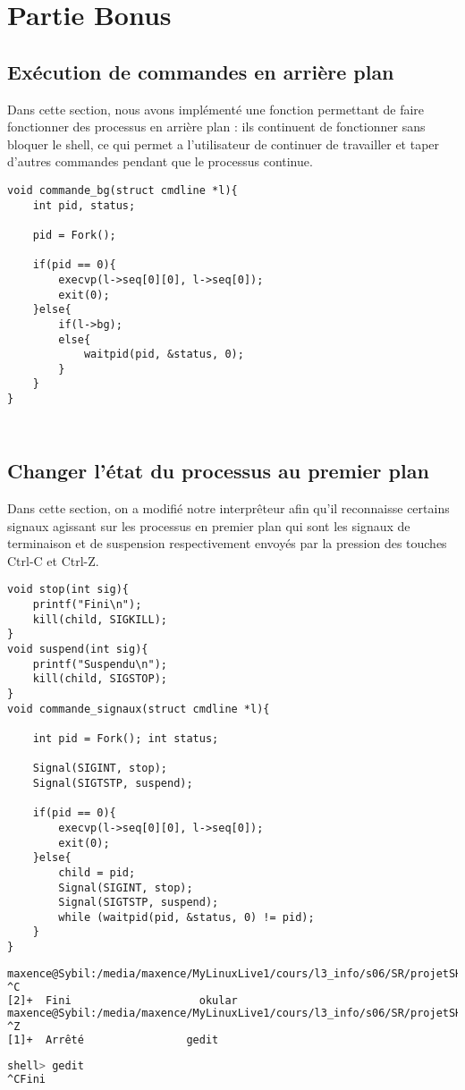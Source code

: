 \documentclass{report}
\begin{document}
	\chapter{Partie Bonus}
		\section{Ex\'ecution de commandes en arri\`ere plan}
	Dans cette section, nous avons impl\'ement\'e une fonction permettant de faire fonctionner des processus en arri\`ere plan : ils continuent de fonctionner sans bloquer le shell, ce qui permet a l'utilisateur de continuer de travailler et taper d'autres commandes pendant que le processus continue.\\
			\begin{lstlisting}
void commande_bg(struct cmdline *l){
	int pid, status;

	pid = Fork();

	if(pid == 0){
		execvp(l->seq[0][0], l->seq[0]);
		exit(0);
	}else{
		if(l->bg);
		else{
			waitpid(pid, &status, 0);
		}
	}
}
			\end{lstlisting}
			\begin{lstlisting}[frame=single,basicstyle=\footnotesize,language=bash]
			\end{lstlisting}
			\begin{lstlisting}[frame=single,basicstyle=\footnotesize,language=bash]
			\end{lstlisting}
		\section{Changer l'\'etat du processus au premier plan}
	Dans cette section, on a modifi\'e notre interpr\^eteur afin qu'il reconnaisse certains signaux agissant sur les processus en premier plan qui sont les signaux de terminaison et de suspension respectivement envoy\'es par la pression des touches Ctrl-C et Ctrl-Z.\\
			\begin{lstlisting}
void stop(int sig){
	printf("Fini\n");
	kill(child, SIGKILL);
}
void suspend(int sig){
	printf("Suspendu\n");
	kill(child, SIGSTOP);
}
void commande_signaux(struct cmdline *l){

	int pid = Fork(); int status;

	Signal(SIGINT, stop);	
	Signal(SIGTSTP, suspend);

	if(pid == 0){
		execvp(l->seq[0][0], l->seq[0]);
		exit(0);
	}else{
		child = pid;
		Signal(SIGINT, stop);
		Signal(SIGTSTP, suspend);
		while (waitpid(pid, &status, 0) != pid);
	}
}
			\end{lstlisting}
			\begin{lstlisting}[frame=single,basicstyle=\footnotesize,language=bash]
maxence@Sybil:/media/maxence/MyLinuxLive1/cours/l3_info/s06/SR/projetSHELL$ gedit 
^C
[2]+  Fini                    okular
maxence@Sybil:/media/maxence/MyLinuxLive1/cours/l3_info/s06/SR/projetSHELL$ gedit 
^Z
[1]+  Arrêté                gedit

			\end{lstlisting}
			\begin{lstlisting}[frame=single,basicstyle=\footnotesize,language=bash]
shell> gedit
^CFini

			\end{lstlisting}
\end{document}
